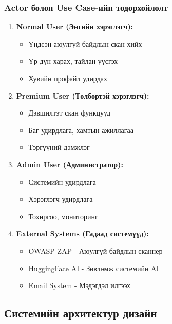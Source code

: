 \documentclass[main.tex]{subfiles}
\begin{document}
\subsubsection{Actor болон Use Case-ийн тодорхойлолт}

\begin{enumerate}
    \item \textbf{Normal User (Энгийн хэрэглэгч):}
    \begin{itemize}
        \item Үндсэн аюулгүй байдлын скан хийх
        \item Үр дүн харах, тайлан үүсгэх
        \item Хувийн профайл удирдах
    \end{itemize}
    
    \item \textbf{Premium User (Төлбөртэй хэрэглэгч):}
    \begin{itemize}
        \item Дэвшилтэт скан функцууд
        \item Баг удирдлага, хамтын ажиллагаа
        \item Тэргүүний дэмжлэг
    \end{itemize}
    
    \item \textbf{Admin User (Администратор):}
    \begin{itemize}
        \item Системийн удирдлага
        \item Хэрэглэгч удирдлага
        \item Тохиргоо, мониторинг
    \end{itemize}
    
    \item \textbf{External Systems (Гадаад системүүд):}
    \begin{itemize}
        \item OWASP ZAP - Аюулгүй байдлын сканнер
        \item HuggingFace AI - Зөвлөмж системийн AI
        \item Email System - Мэдэгдэл илгээх
    \end{itemize}
\end{enumerate}

\subsection{Системийн архитектур дизайн}
\end{document}
